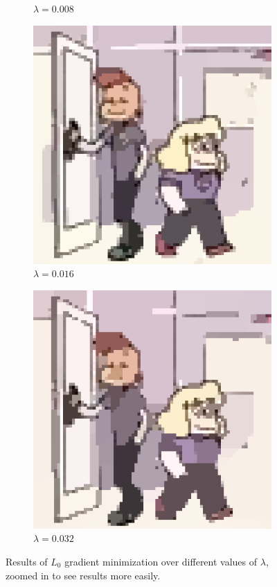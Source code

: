 \documentclass[10pt,twocolumn,letterpaper]{article}
\begin{document}
\begin{figure}
\begin{subfigure}{.48\linewidth}
\caption{$\lambda = 0.008$}
\end{subfigure}
\begin{subfigure}{.48\linewidth}
\includegraphics[width=\linewidth]{gradminResults/gradmin_sadylars_large_0016.png}
\caption{$\lambda = 0.016$}
\end{subfigure}
\begin{subfigure}{.48\linewidth}
\includegraphics[width=\linewidth]{gradminResults/gradmin_sadylars_large_0032.png}
\caption{$\lambda = 0.032$}
\end{subfigure}
\caption{Results of $L_0$ gradient minimization over different values of $\lambda$, zoomed in to see results more easily.}
\label{fig:gradminResultsSadylars}
\end{figure}

{\small


}
\end{document}
